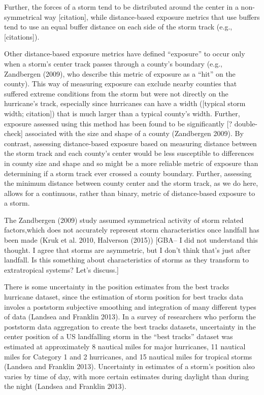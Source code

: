 \documentclass[]{elsarticle} %
\begin{document}
Further, the forces of a storm tend to be distributed around the center
in a non-symmetrical way {[}citation{]}, while distance-based exposure
metrics that use buffers tend to use an equal buffer distance on each
side of the storm track (e.g., {[}citations{]}).

Other distance-based exposure metrics have defined ``exposure'' to occur
only when a storm's center track passes through a county's boundary
(e.g., Zandbergen (2009), who describe this metric of exposure as a
``hit'' on the county). This way of measuring exposure can exclude
nearby counties that suffered extreme conditions from the storm but were
not directly on the hurricane's track, especially since hurricanes can
have a width ({[}typical storm width; citation{]}) that is much larger
than a typical county's width. Further, exposure assessed using this
method has been found to be significantly {[}? double-check{]}
associated with the size and shape of a county (Zandbergen 2009). By
contrast, assessing distance-based exposure based on measuring distance
between the storm track and each county's center would be less
susceptible to differences in county size and shape and so might be a
more reliable metric of exposure than determining if a storm track ever
crossed a county boundary. Further, assessing the minimum distance
between county center and the storm track, as we do here, allows for a
continuous, rather than binary, metric of distance-based exposure to a
storm.

The Zandbergen (2009) study assumed symmetrical activity of storm
related factors,which does not accurately represent storm
characteristics once landfall has been made (Kruk et al. 2010, Halverson
(2015)) {[}GBA-- I did not understand this thought. I agree that storms
are asymmetric, but I don't think that's just after landfall. Is this
something about characteristics of storms as they transform to
extratropical systems? Let's discuss.{]}

There is some uncertainty in the position estimates from the best tracks
hurricane dataset, since the estimation of storm position for best
tracks data involes a poststorm subjective smoothing and integration of
many different types of data (Landsea and Franklin 2013). In a survey of
researchers who perform the poststorm data aggregation to create the
best tracks datasets, uncertainty in the center position of a US
landfalling storm in the ``best tracks'' dataset was estimated at
approximately 8 nautical miles for major hurricanes, 11 nautical miles
for Category 1 and 2 hurricanes, and 15 nautical miles for tropical
storms (Landsea and Franklin 2013). Uncertainty in estimates of a
storm's position also varies by time of day, with more certain estimates
during daylight than during the night (Landsea and Franklin 2013).
\end{document}
